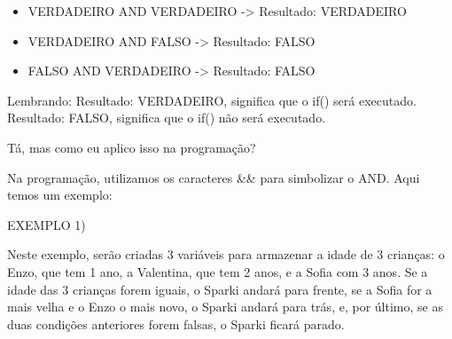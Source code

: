 \documentclass[conference]{IEEEtran}
\begin{document}
\begin{itemize}
    \item VERDADEIRO AND VERDADEIRO -> Resultado: VERDADEIRO
    \item VERDADEIRO AND FALSO -> Resultado: FALSO
    \item FALSO AND VERDADEIRO -> Resultado: FALSO
\end{itemize}
\par
Lembrando: Resultado: VERDADEIRO, significa que o if() será executado. Resultado: FALSO, significa que o if() não será executado.
\par
Tá, mas como eu aplico isso na programação?
\par
Na programação, utilizamos os caracteres \&\& para simbolizar o AND. Aqui temos um exemplo:
\\
\begin{center}
EXEMPLO 1)
\end{center}
\par
Neste exemplo, serão criadas 3 variáveis para armazenar a idade de 3 crianças: o Enzo, que tem 1 ano, a Valentina, que tem 2 anos, e a Sofia com 3 anos. Se a idade das 3 crianças forem iguais, o Sparki andará para frente, se a Sofia for a mais velha e o Enzo o mais novo, o Sparki andará para trás, e, por último, se as duas condições anteriores forem falsas, o Sparki ficará parado.
\\
\\
\end{document}
